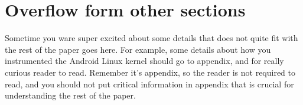 \section{Overflow form other sections}
\label{sec:set-diff-dodis}
Sometime you ware super excited about some details that does not quite fit with
the rest of the paper goes here. For example, some details about how you
instrumented the Android Linux kernel should go to appendix, and for really
curious reader to read. Remember it's appendix, so the reader is not required to
read, and you should not put critical information in appendix that is crucial
for understanding the rest of the paper.
